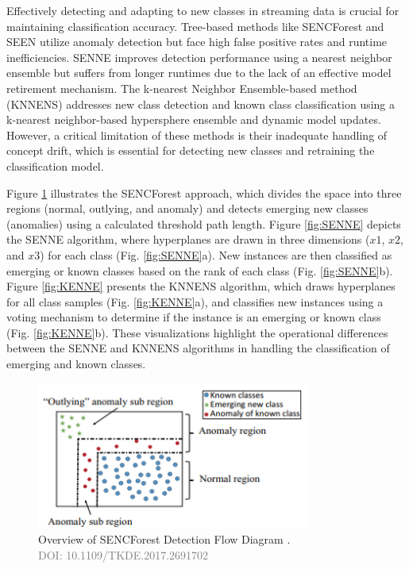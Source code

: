 Effectively detecting and adapting to new classes in streaming data is crucial for maintaining classification accuracy. Tree-based methods like SENCForest \cite{mu2017classification} and SEEN \cite{zhu2020semi} utilize anomaly detection but face high false positive rates and runtime inefficiencies. SENNE improves detection performance using a nearest neighbor ensemble but suffers from longer runtimes due to the lack of an effective model retirement mechanism. The k-nearest Neighbor Ensemble-based method \cite{zhang2022knnens} (KNNENS) addresses new class detection and known class classification using a k-nearest neighbor-based hypersphere ensemble and dynamic model updates. However, a critical limitation of these methods is their inadequate handling of concept drift, which is essential for detecting new classes and retraining the classification model.

Figure \ref{fig:SENCForest} illustrates the SENCForest approach, which divides the space into three regions (normal, outlying, and anomaly) and detects emerging new classes (anomalies) using a calculated threshold path length. Figure \ref{fig:SENNE} depicts the SENNE algorithm, where hyperplanes are drawn in three dimensions ($x1$, $x2$, and $x3$) for each class (Fig. \ref{fig:SENNE}a). New instances are then classified as emerging or known classes based on the rank of each class (Fig. \ref{fig:SENNE}b). Figure \ref{fig:KENNE} presents the KNNENS algorithm, which draws hyperplanes for all class samples (Fig. \ref{fig:KENNE}a), and classifies new instances using a voting mechanism to determine if the instance is an emerging or known class (Fig. \ref{fig:KENNE}b). These visualizations highlight the operational differences between the SENNE and KNNENS algorithms in handling the classification of emerging and known classes.

\begin{figure}[!ht]
    \centering
    \includegraphics[width=0.80\textwidth]{3_State-of-the-art/fig/SENCForst.png}
    \caption{Overview of SENCForest Detection Flow Diagram \cite{mu2017classification}. \\
    \textcolor{gray}{\fontsize{10}{0}\selectfont DOI: 10.1109/TKDE.2017.2691702}}
    \label{fig:SENCForest}
\end{figure}
    

